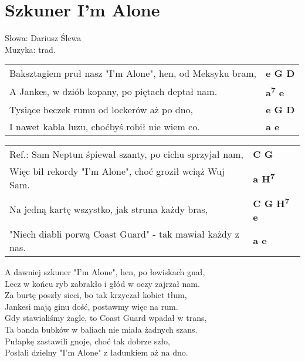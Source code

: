 \section{Szkuner I'm Alone}

Słowa: Dariusz Ślewa \\
Muzyka:  trad.

\vspace{2em}
\begin{tabular}{@{}p{10cm}@{}l@{}}
Baksztagiem pruł nasz "I'm Alone", hen, od Meksyku bram, & \bfseries  e G D \\
A Jankes, w dziób kopany, po piętach deptał nam. & \bfseries  a\textsuperscript{7} e \\
Tysiące beczek rumu od lockerów aż po dno, & \bfseries e G D \\
I nawet kabla luzu, choćbyś robił nie wiem co. & \bfseries a e \\
\end{tabular}

\vspace{1em}
\begin{tabular}{@{}p{10cm}@{}l@{}}
Ref.: Sam Neptun śpiewał szanty, po cichu sprzyjał nam, & \bfseries  C G \\
Więc bił rekordy "I'm Alone", choć groził wciąż Wuj Sam. & \bfseries a H\textsuperscript{7} \\
Na jedną kartę wszystko, jak struna każdy bras, & \bfseries C G H\textsuperscript{7} e \\
"Niech diabli porwą Coast Guard" - tak mawiał każdy z nas. & \bfseries  a e \\
\end{tabular}

\vspace{1em}
A dawniej szkuner "I'm Alone", hen, po łowiskach gnał, \\
Lecz w końcu ryb zabrakło i głód w oczy zajrzał nam. \\
Za burtę poszły sieci, bo tak krzyczał kobiet tłum, \\
Jankesi mają ginu dość, postawmy więc na rum. \\

Gdy stawialiśmy żagle, to Coast Guard wpadał w trans, \\
Ta banda bubków w baliach nie miała żadnych szans. \\
Pułapkę zastawili gnoje, choć tak dobrze szło, \\
Posłali dzielny "I'm Alone" z ładunkiem aż na dno. \\

